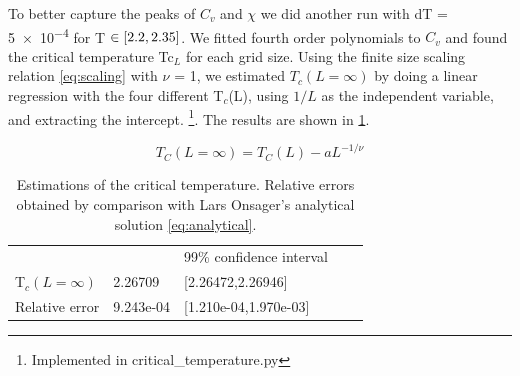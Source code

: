 %
To better capture the peaks of $C_v$ and $\chi$ we did another
run with dT = \num{5e-4} for T $\in \left[2.2, 2.35\right]$.
 We fitted fourth order polynomials to $C_v$ and found
the critical temperature Tc$_{L}$ for each grid size.
Using the finite size scaling relation
\cref{eq:scaling} with $\nu$ = 1, we estimated $T_c(L=\infty)$
by doing a linear
regression with the four different T$_c$(L), using $1/L$ as the independent
variable, and extracting the intercept.
\footnote{Implemented in critical\_temperature.py}. The results are shown in
\cref{tab:results}.

 \begin{equation}
   \label{eq:scaling}
   T_C(L=\infty) = T_C(L) - aL^{-1/\nu}
 \end{equation}




 \begin{table}[htp]
 \centering
 \begin{tabular}{|l|l|l|ll}
 \cline{1-3}
                &        & 99\% confidence interval  &  &  \\ \cline{1-3}
 T$_c(L=\infty)$          & 2.26709   & {[}2.26472,2.26946{]}     &  &  \\ \cline{1-3}
 Relative error & 9.243e-04 & {[}1.210e-04,1.970e-03{]} &  &  \\ \cline{1-3}
 \end{tabular}
 \caption{Estimations of the critical temperature. Relative errors obtained by
 comparison with Lars Onsager's analytical solution \cref{eq:analytical}.}
 \label{tab:results}
 \end{table}


